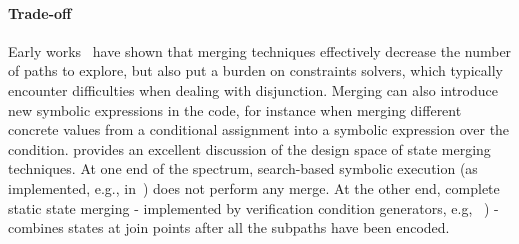 \paragraph{Trade-off} Early works~\cite{G-POPL07,HSS-RV09} have shown that merging techniques effectively decrease the number of paths to explore, but also put a burden on constraints solvers, which typically encounter difficulties when dealing with disjunction. Merging can also introduce new symbolic expressions in the code, for instance when merging different concrete values from a conditional assignment into a symbolic expression over the condition. \cite{KKB-PLDI12} provides an excellent discussion of the design space of state merging techniques. At one end of the spectrum, search-based symbolic execution (as implemented, e.g., in~\cite{KLEE-OSDI08}) does not perform any merge. At the other end, complete static state merging - implemented by verification condition generators, e.g, ~\cite{SATURN-POPL05,CALYSTO-ICSE08}) - combines states at join points after all the subpaths have been encoded.


